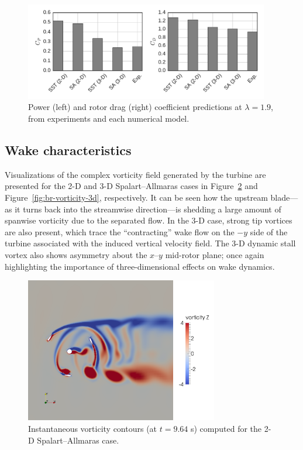 \documentclass[aip,graphicx]{revtex4-1}
\begin{document}
\begin{figure}
    \centering

    \includegraphics[width=0.95\textwidth]{perf_bar_chart}

    \caption{Power (left) and rotor drag (right) coefficient predictions at
    $\lambda = 1.9$, from experiments and each numerical model.}

    \label{fig:br-cfd-perf-bar-chart}
\end{figure}


\subsection{Wake characteristics}

Visualizations of the complex vorticity field generated by the turbine are
presented for the 2-D and 3-D Spalart--Allmaras cases in
Figure~\ref{fig:br-vorticity-2d} and Figure~\ref{fig:br-vorticity-3d},
respectively. It can be seen how the upstream blade---as it turns back into the
streamwise direction---is shedding a large amount of spanwise vorticity due to
the separated flow. In the 3-D case, strong tip vortices are also present, which
trace the ``contracting'' wake flow on the $-y$ side of the turbine associated
with the induced vertical velocity field. The 3-D dynamic stall vortex also
shows asymmetry about the $x$--$y$ mid-rotor plane; once again highlighting the
importance of three-dimensional effects on wake dynamics.

\begin{figure}
    \centering

    \includegraphics[width=0.75\textwidth]{2D_vorticity_SA_964}

    \caption{Instantaneous vorticity contours (at $t=9.64$ s) computed for the
        2-D Spalart--Allmaras case.}

    \label{fig:br-vorticity-2d}
\end{figure}
\end{document}
